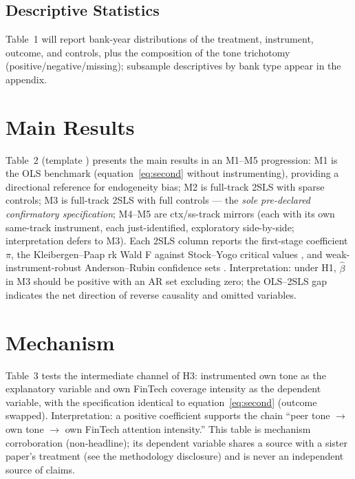 \subsection{Descriptive Statistics}
Table~1 will report bank-year distributions of the treatment, instrument, outcome, and
controls, plus the composition of the tone trichotomy (positive/negative/missing); subsample
descriptives by bank type appear in the appendix.

\section{Main Results}\label{sec:main}

Table~2 (template ) presents the main results in an M1--M5
progression: M1 is the OLS benchmark (equation~\eqref{eq:second} without instrumenting),
providing a directional reference for endogeneity bias; M2 is full-track 2SLS with sparse
controls; M3 is full-track 2SLS with full controls --- the \emph{sole pre-declared
confirmatory specification}; M4--M5 are ctx/ss-track mirrors (each with its own same-track
instrument, each just-identified, exploratory side-by-side; interpretation defers to M3). Each
2SLS column reports the first-stage coefficient $\pi$, the Kleibergen--Paap rk Wald F
\parencite{kleibergen2006rank} against Stock--Yogo critical values \parencite{stock2005weak},
and weak-instrument-robust Anderson--Rubin confidence sets \parencite{andrews2019weakiv}.
Interpretation: under H1, $\hat\beta$ in M3 should be positive with an AR set excluding zero;
the OLS--2SLS gap indicates the net direction of reverse causality and omitted variables.

\section{Mechanism}\label{sec:mech}

Table~3 tests the intermediate channel of H3: instrumented own tone as the explanatory
variable and own FinTech coverage intensity  as the dependent
variable, with the specification identical to equation~\eqref{eq:second} (outcome swapped).
Interpretation: a positive coefficient supports the chain ``peer tone $\rightarrow$ own tone
$\rightarrow$ own FinTech attention intensity.'' This table is mechanism corroboration
(non-headline); its dependent variable shares a source with a sister paper's treatment (see
the methodology disclosure) and is never an independent source of claims.

